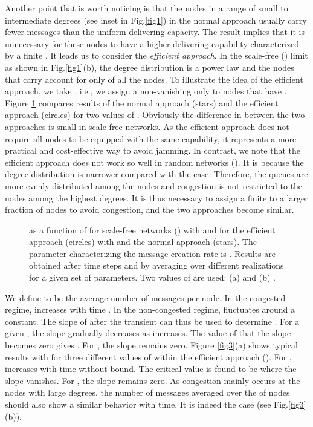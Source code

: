 \documentclass[aps,prl,twocolumn,superscriptaddress,showpacs]{revtex4}
\begin{document}
Another point that is worth noticing is that the nodes in a range
of small to intermediate degrees (see inset in Fig.\ref{fig1}) in
the normal approach usually carry fewer messages than the uniform
delivering capacity.  The result implies that it is unnecessary
for these nodes to have a higher delivering capability
characterized by a finite .  It leads us to consider the
{\em efficient approach}.  In the scale-free () limit as
shown in Fig.\ref{fig1}(b), the degree distribution is a power
law and the nodes that carry  account for only  of
all the  nodes.  To illustrate the idea of the efficient
approach, we take , i.e., we assign a non-vanishing
 only to nodes that have .  Figure \ref{fig2}
compares results of the normal approach (stars) and the efficient
approach (circles) for two values of .  Obviously the
difference in  between the two approaches
is small in scale-free networks.  As the efficient approach does
not require all nodes to be equipped with the same capability, it
represents a more practical and cost-effective way to avoid
jamming.  In contrast, we note that the efficient approach does
not work so well in random networks ().  It is because the
degree distribution is narrower compared with the  case.
Therefore, the queues are more evenly distributed among the nodes
and congestion is not restricted to the nodes among the highest
degrees.  It is thus necessary to assign a finite  to a larger
fraction of nodes to avoid congestion, and the two approaches
become similar.

\begin{figure}
\begin{center}
 \caption{ as a function of  for scale-free networks ()
with  and  for the efficient approach (circles) with
 and the normal approach (stars).   The parameter
characterizing the message creation rate is .
Results are obtained after  time steps and by averaging
over  different realizations for a given set of parameters.
Two values of  are used: (a)  and (b) .} \label{fig2}
\end{center}
\end{figure}

We define  to be the average number of
messages per node.  In the congested regime,  increases with time .  In the non-congested regime,
 fluctuates around a constant. The
slope of  after the transient can thus be used to
determine 
\cite{arenas3:2003,moreno2:2004}. For a given , the
slope gradually decreases as  increases.  The value of
 that the slope becomes zero gives . For
, the slope remains zero.  Figure \ref{fig3}(a)
shows typical results with  for three different
values of  within the efficient approach ().  For
,  increases with time
without bound.  The critical value is found to be  where the slope vanishes.  For ,
the slope remains zero.  As congestion mainly occurs at the nodes
with large degrees, the number of messages  averaged over the  of nodes should also show a
similar behavior with time.  It is indeed the case (see
Fig.\ref{fig3}(b)).
\end{document}
